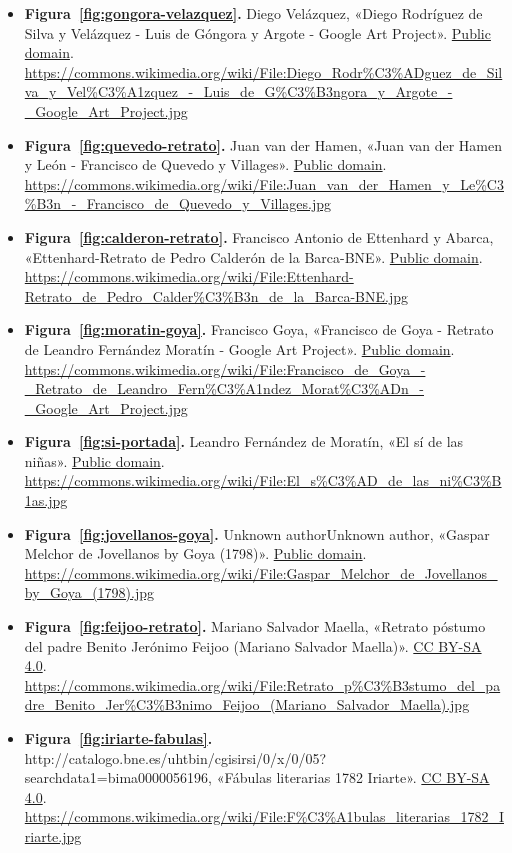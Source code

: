 \documentclass{book}
\begin{document}
\begin{itemize}
\item \textbf{Figura~\ref{fig:gongora-velazquez}.} Diego Velázquez, «Diego Rodríguez de Silva y Velázquez - Luis de Góngora y Argote - Google Art Project». \href{https://creativecommons.org/publicdomain/mark/1.0/}{Public domain}. \url{https://commons.wikimedia.org/wiki/File:Diego_Rodr%C3%ADguez_de_Silva_y_Vel%C3%A1zquez_-_Luis_de_G%C3%B3ngora_y_Argote_-_Google_Art_Project.jpg}
\item \textbf{Figura~\ref{fig:quevedo-retrato}.} Juan van der Hamen, «Juan van der Hamen y León - Francisco de Quevedo y Villages». \href{https://creativecommons.org/publicdomain/mark/1.0/}{Public domain}. \url{https://commons.wikimedia.org/wiki/File:Juan_van_der_Hamen_y_Le%C3%B3n_-_Francisco_de_Quevedo_y_Villages.jpg}
\item \textbf{Figura~\ref{fig:calderon-retrato}.} Francisco Antonio de Ettenhard y Abarca, «Ettenhard-Retrato de Pedro Calderón de la Barca-BNE». \href{https://creativecommons.org/publicdomain/mark/1.0/}{Public domain}. \url{https://commons.wikimedia.org/wiki/File:Ettenhard-Retrato_de_Pedro_Calder%C3%B3n_de_la_Barca-BNE.jpg}
\item \textbf{Figura~\ref{fig:moratin-goya}.} Francisco Goya, «Francisco de Goya - Retrato de Leandro Fernández Moratín - Google Art Project». \href{https://creativecommons.org/publicdomain/mark/1.0/}{Public domain}. \url{https://commons.wikimedia.org/wiki/File:Francisco_de_Goya_-_Retrato_de_Leandro_Fern%C3%A1ndez_Morat%C3%ADn_-_Google_Art_Project.jpg}
\item \textbf{Figura~\ref{fig:si-portada}.} Leandro Fernández de Moratín, «El sí de las niñas». \href{https://creativecommons.org/publicdomain/mark/1.0/}{Public domain}. \url{https://commons.wikimedia.org/wiki/File:El_s%C3%AD_de_las_ni%C3%B1as.jpg}
\item \textbf{Figura~\ref{fig:jovellanos-goya}.} Unknown authorUnknown author, «Gaspar Melchor de Jovellanos by Goya (1798)». \href{https://creativecommons.org/publicdomain/mark/1.0/}{Public domain}. \url{https://commons.wikimedia.org/wiki/File:Gaspar_Melchor_de_Jovellanos_by_Goya_(1798).jpg}
\item \textbf{Figura~\ref{fig:feijoo-retrato}.} Mariano Salvador Maella, «Retrato póstumo del padre Benito Jerónimo Feijoo (Mariano Salvador Maella)». \href{https://creativecommons.org/licenses/by-sa/4.0/}{CC BY-SA 4.0}. \url{https://commons.wikimedia.org/wiki/File:Retrato_p%C3%B3stumo_del_padre_Benito_Jer%C3%B3nimo_Feijoo_(Mariano_Salvador_Maella).jpg}
\item \textbf{Figura~\ref{fig:iriarte-fabulas}.} http://catalogo.bne.es/uhtbin/cgisirsi/0/x/0/05?searchdata1=bima0000056196, «Fábulas literarias 1782 Iriarte». \href{https://creativecommons.org/licenses/by-sa/4.0/}{CC BY-SA 4.0}. \url{https://commons.wikimedia.org/wiki/File:F%C3%A1bulas_literarias_1782_Iriarte.jpg}

\end{itemize}
\end{document}
